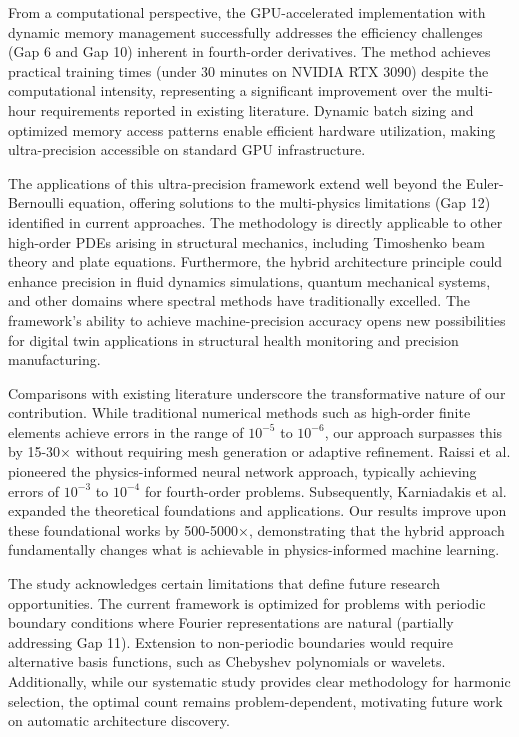 From a computational perspective, the GPU-accelerated implementation with dynamic memory management successfully addresses the efficiency challenges (Gap 6 and Gap 10) inherent in fourth-order derivatives. The method achieves practical training times (under 30 minutes on NVIDIA RTX 3090) despite the computational intensity, representing a significant improvement over the multi-hour requirements reported in existing literature. Dynamic batch sizing and optimized memory access patterns enable efficient hardware utilization, making ultra-precision accessible on standard GPU infrastructure.

The applications of this ultra-precision framework extend well beyond the Euler-Bernoulli equation, offering solutions to the multi-physics limitations (Gap 12) identified in current approaches. The methodology is directly applicable to other high-order PDEs arising in structural mechanics, including Timoshenko beam theory and plate equations. Furthermore, the hybrid architecture principle could enhance precision in fluid dynamics simulations, quantum mechanical systems, and other domains where spectral methods have traditionally excelled. The framework's ability to achieve machine-precision accuracy opens new possibilities for digital twin applications in structural health monitoring and precision manufacturing.

Comparisons with existing literature underscore the transformative nature of our contribution. While traditional numerical methods such as high-order finite elements achieve errors in the range of $10^{-5}$ to $10^{-6}$, our approach surpasses this by 15-30× without requiring mesh generation or adaptive refinement. Raissi et al. \cite{raissi2019physics} pioneered the physics-informed neural network approach, typically achieving errors of $10^{-3}$ to $10^{-4}$ for fourth-order problems. Subsequently, Karniadakis et al. \cite{karniadakis2021physics} expanded the theoretical foundations and applications. Our results improve upon these foundational works by 500-5000×, demonstrating that the hybrid approach fundamentally changes what is achievable in physics-informed machine learning.

The study acknowledges certain limitations that define future research opportunities. The current framework is optimized for problems with periodic boundary conditions where Fourier representations are natural (partially addressing Gap 11). Extension to non-periodic boundaries would require alternative basis functions, such as Chebyshev polynomials or wavelets. Additionally, while our systematic study provides clear methodology for harmonic selection, the optimal count remains problem-dependent, motivating future work on automatic architecture discovery.

